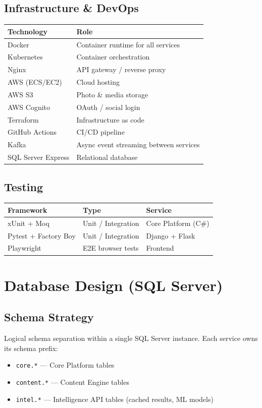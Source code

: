 \documentclass[12pt,letterpaper]{article}
\begin{document}
\subsection{Infrastructure \& DevOps}
\begin{tabular}{|l|l|}
\hline
\textbf{Technology} & \textbf{Role} \\
\hline
Docker & Container runtime for all services \\
Kubernetes & Container orchestration \\
Nginx & API gateway / reverse proxy \\
AWS (ECS/EC2) & Cloud hosting \\
AWS S3 & Photo \& media storage \\
AWS Cognito & OAuth / social login \\
Terraform & Infrastructure as code \\
GitHub Actions & CI/CD pipeline \\
Kafka & Async event streaming between services \\
SQL Server Express & Relational database \\
\hline
\end{tabular}

\subsection{Testing}
\begin{tabular}{|l|l|l|}
\hline
\textbf{Framework} & \textbf{Type} & \textbf{Service} \\
\hline
xUnit + Moq & Unit / Integration & Core Platform (C\#) \\
Pytest + Factory Boy & Unit / Integration & Django + Flask \\
Playwright & E2E browser tests & Frontend \\
\hline
\end{tabular}

\newpage

\section{Database Design (SQL Server)}

\subsection{Schema Strategy}
Logical schema separation within a single SQL Server instance. Each service owns its schema prefix:
\begin{itemize}
  \item \texttt{core.*} --- Core Platform tables
  \item \texttt{content.*} --- Content Engine tables
  \item \texttt{intel.*} --- Intelligence API tables (cached results, ML models)
\end{itemize}
\end{document}
